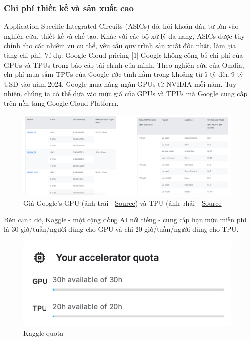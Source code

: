 \documentclass[a4paper]{article}
\begin{document}
\subsubsection{Chi phí thiết kế và sản xuất cao}
Application-Specific Integrated Circuits (ASICs) đòi hỏi khoản đầu tư lớn vào nghiên cứu, thiết kế và chế tạo. Khác với các bộ xử lý đa năng, ASICs được tùy chỉnh cho các nhiệm vụ cụ thể, yêu cầu quy trình sản xuất độc nhất, làm gia tăng chi phí.
Ví dụ: Google Cloud pricing [1]
Google không công bố chi phí của GPUs và TPUs trong báo cáo tài chính của mình.
Theo nghiên cứu của Omdia, chi phí mua sắm TPUs của Google ước tính nằm trong khoảng từ 6 tỷ đến 9 tỷ USD vào năm 2024.
Google mua hàng ngàn GPUs từ NVIDIA mỗi năm.
Tuy nhiên, chúng ta có thể dựa vào mức giá của GPUs và TPUs mà Google cung cấp trên nền tảng Google Cloud Platform.
\begin{figure}[H]
    \centering
    \includegraphics[width=0.75\linewidth]{assets/asic-gg.png}
    \caption{Giá Google’s GPU (ảnh trái - \href{https://cloud.google.com/compute/gpus-pricing?hl=en}{Source}) và TPU (ảnh phải - \href{https://cloud.google.com/tpu/pricing?hl=en}{Source}}
    \label{fig:enter-label}
\end{figure}

Bên cạnh đó, Kaggle - một cộng đồng AI nổi tiếng - cung cấp hạn mức miễn phí là 30 giờ/tuần/người dùng cho GPU và chỉ 20 giờ/tuần/người dùng cho TPU.
\begin{figure}[H]
    \centering
    \includegraphics[width=0.75\linewidth]{assets/asic-kg.png}
    \caption{Kaggle quota}
    \label{fig:enter-label}
\end{figure}
\end{document}
